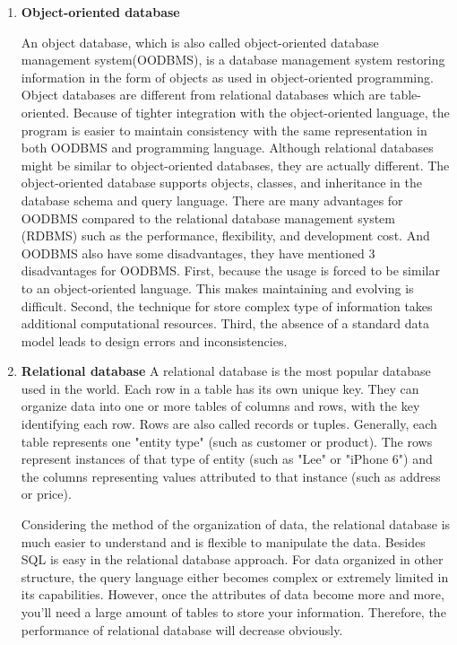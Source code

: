 \begin{enumerate}
	
	
	\item\textbf{Object-oriented database}
	\setlength{\parindent}{1em}		
	
	An object database, which is also called object-oriented database management system(OODBMS), is a database management system 
	restoring information in the form of objects as used in object-oriented programming.
	Object databases are different from relational databases which are table-oriented.
	Because of tighter integration with the object-oriented language, 
	the program is easier to maintain consistency with the same representation in both OODBMS and programming language.
	Although relational databases might be similar to object-oriented databases, they are actually different.
	The object-oriented database supports objects, classes, and inheritance in the database schema and query language.
	There are many advantages for OODBMS compared to the relational database management system (RDBMS) such as the performance, flexibility, and development cost.
	And OODBMS also have some disadvantages, they have mentioned 3 disadvantages for OODBMS.
	First, because the usage is forced to be similar to an object-oriented language.
	This makes maintaining and evolving is difficult.
	Second, the technique for store complex type of information takes additional computational resources.
	Third, the absence of a standard data model leads to design errors and inconsistencies.
	
	
	
	\item\textbf{Relational database}
	\setlength{\parindent}{1em}	
	A relational database is the most popular database used in the world.
	Each row in a table has its own unique key. 
	They can organize data into one or more tables of columns and rows, with the key identifying each row.
	Rows are also called records or tuples.
	Generally, each table represents one "entity type" (such as customer or product).
	The rows represent instances of that type of entity (such as "Lee" or "iPhone 6") 
	and the columns representing values attributed to that instance (such as address or price).
	
	Considering the method of the organization of data, the relational database is much easier to understand and is flexible to manipulate the data.
	Besides SQL is easy in the relational database approach.
	For data organized in other structure, the query language either becomes complex or extremely limited in its capabilities.
	However, once the attributes of data become more and more, you'll need a large amount of tables to store your information.
	Therefore, the performance of relational database will decrease obviously.



\end{enumerate}
